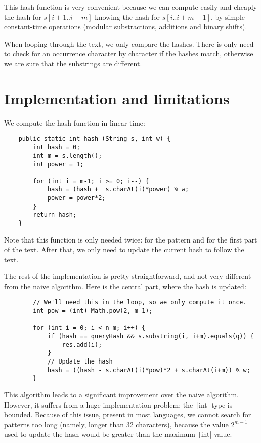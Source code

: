\documentclass[a4paper,11pt,openany,extrafontsizes,twoside,article]{memoir}
\begin{document}
This hash function is very convenient because we can compute easily
and cheaply the hash for $s[i+1..i+m]$ knowing the hash for
$s[i..i+m-1]$, by simple constant-time operations (modular
substractions, additions and binary shifts).

When looping through the text, we only compare the hashes. There is
only need to check for an occurrence character by character if the
hashes match, otherwise we are sure that the substrings are different.

\section{Implementation and limitations}
\label{sec:impl-limit}

We compute the hash function in linear-time:

\begin{verbatim}
    public static int hash (String s, int w) {
        int hash = 0;
        int m = s.length();
        int power = 1;

        for (int i = m-1; i >= 0; i--) {
            hash = (hash +  s.charAt(i)*power) % w;
            power = power*2;
        }
        return hash;
    }
\end{verbatim}

Note that this function is only needed twice: for the pattern and for
the first part of the text. After that, we only need to update the
current hash to follow the text.

The rest of the implementation is pretty straightforward, and not very
different from the naive algorithm. Here is the central part, where
the hash is updated:

\begin{verbatim}
        // We'll need this in the loop, so we only compute it once.
        int pow = (int) Math.pow(2, m-1);

        for (int i = 0; i < n-m; i++) {
            if (hash == queryHash && s.substring(i, i+m).equals(q)) {
                res.add(i);
            }
            // Update the hash
            hash = ((hash - s.charAt(i)*pow)*2 + s.charAt(i+m)) % w;
        }
\end{verbatim}

This algorithm leads to a significant improvement over the naive
algorithm. However, it suffers from a huge implementation problem: the
\texttt|int| type is bounded. Because of this issue, present
in most languages, we cannot search for patterns too long (namely,
longer than 32 characters), because the value $2^{m-1}$ used to update
the hash would be greater than the maximum \texttt|int|
value.
\end{document}
